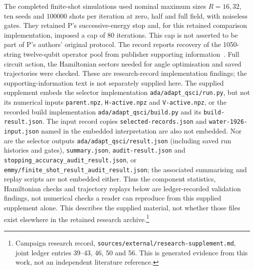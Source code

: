 \documentclass{article}
\newcommand{\record}[1]{\footnote{Campaign research record, \texttt{sources/external/research-supplement.md}, #1. This is generated evidence from this work, not an independent literature reference.}}
\begin{document}
The completed finite-shot simulations used nominal maximum sizes \(R=16,32\), ten seeds and 100000 shots per iteration at zero, half and full field, with noiseless gates. They retained P's successive-energy stop and, for this retained comparison implementation, imposed a cap of 80 iterations. This cap is not asserted to be part of P's authors' original protocol. The record reports recovery of the 1050-string twelve-qubit operator pool from publisher supporting information~\cite{SI,SIfile}. Full circuit action, the Hamiltonian sectors needed for angle optimisation and saved trajectories were checked. These are research-record implementation findings; the supporting-information text is not separately supplied here. The supplied supplement embeds the selector implementation \texttt{ada/adapt\_qsci/run.py}, but not its numerical inputs \texttt{parent.npz}, \texttt{H-active.npz} and \texttt{V-active.npz}, or the recorded build implementation \texttt{ada/adapt\_qsci/build.py} and its \texttt{build-result.json}. The input record copies \texttt{selected-records.json} and \texttt{water-1926-input.json} named in the embedded interpretation are also not embedded. Nor are the selector outputs \texttt{ada/adapt\_qsci/result.json} (including saved run histories and gates), \texttt{summary.json}, \texttt{audit-result.json} and \texttt{stopping\_accuracy\_audit\_result.json}, or \texttt{emmy/finite\_shot\_result\_audit\_result.json}; the associated summarising and replay scripts are not embedded either. Thus the component statistics, Hamiltonian checks and trajectory replays below are ledger-recorded validation findings, not numerical checks a reader can reproduce from this supplied supplement alone. This describes the supplied material, not whether those files exist elsewhere in the retained research archive.\record{joint ledger entries 39--43, 46, 50 and 56}
\end{document}
